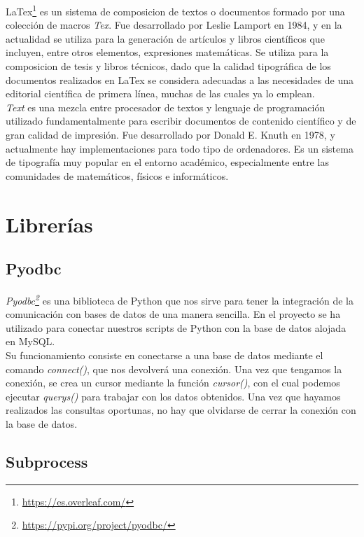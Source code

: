 \documentclass[a4paper, 12pt]{book}
\begin{document}
LaTex\footnote{\url{https://es.overleaf.com/}} es un sistema de composicion de textos o documentos formado por una colección de macros \textit{Tex}. Fue desarrollado
por Leslie Lamport en 1984, y en la actualidad se utiliza para la generación de artículos y libros científicos que incluyen, entre otros elementos, expresiones matemáticas.
Se utiliza para la composicion de tesis y libros técnicos, dado que la calidad tipográfica de los documentos realizados en LaTex se considera adecuadas a las necesidades de
una editorial científica de primera línea, muchas de las cuales ya lo emplean.
\\\textit{Text} es una mezcla entre procesador de textos y lenguaje de programación utilizado fundamentalmente para escribir documentos de contenido científico
y de gran calidad de impresión. Fue desarrollado por Donald E. Knuth en 1978, y actualmente hay implementaciones para todo tipo de ordenadores.
Es un sistema de tipografía muy popular en el entorno académico, especialmente entre las comunidades de matemáticos, físicos e informáticos.

\section{Librerías} 
\label{sec:librerias}

\subsection{Pyodbc}
\label{subsec:pyodbc}

\textit{Pyodbc\footnote{\url{https://pypi.org/project/pyodbc/}}} es una biblioteca de Python que nos sirve para tener la integración de la comunicación con bases de datos de una manera sencilla. En el 
proyecto se ha utilizado para conectar nuestros scripts de Python con la base de datos alojada en MySQL.
\\Su funcionamiento consiste en conectarse a una base de datos mediante el comando \textit{connect()}, que nos devolverá una conexión. Una vez que tengamos
la conexión, se crea un cursor mediante la función \textit{cursor()}, con el cual podemos ejecutar \textit{querys()} para trabajar con los datos obtenidos. Una vez
que hayamos realizados las consultas oportunas, no hay que olvidarse de cerrar la conexión con la base de datos.

\subsection{Subprocess}
\label{subsec:subprocess}
\end{document}
